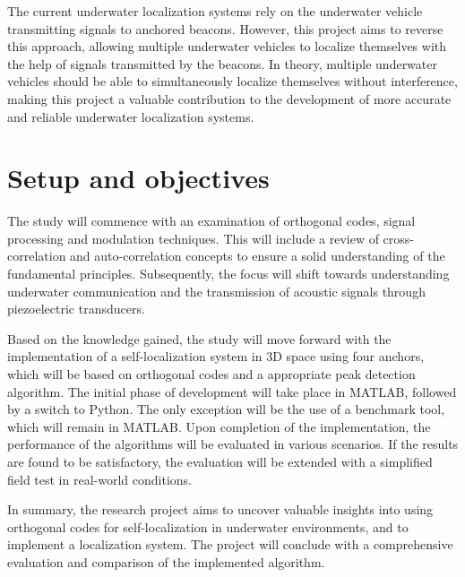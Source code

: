 The current underwater localization systems rely on the underwater vehicle transmitting signals to anchored beacons. However, this project aims to reverse this approach, allowing multiple underwater vehicles to localize themselves with the help of signals transmitted by the beacons. In theory, multiple underwater vehicles should be able to simultaneously localize themselves without interference, making this project a valuable contribution to the development of more accurate and reliable underwater localization systems.
\section{Setup and objectives}
The study will commence with an examination of orthogonal codes, signal processing and modulation techniques. This will include a review of cross-correlation and auto-correlation concepts to ensure a solid understanding of the fundamental principles. Subsequently, the focus will shift towards understanding underwater communication and the transmission of acoustic signals through piezoelectric transducers.

Based on the knowledge gained, the study will move forward with the implementation of a self-localization system in 3D space using four anchors, which will be based on orthogonal codes and a  appropriate peak detection algorithm. The initial phase of development will take place in MATLAB, followed by a switch to Python. The only exception will be the use of a benchmark tool, which will remain in MATLAB.
Upon completion of the implementation, the performance of the algorithms will be evaluated in various scenarios. If the results are found to be satisfactory, the evaluation will be extended with a simplified field test in real-world conditions. 

In summary, the research project aims to uncover valuable insights into using orthogonal codes for self-localization in underwater environments, and to implement a localization system. The project will conclude with a comprehensive evaluation and comparison of the implemented algorithm.